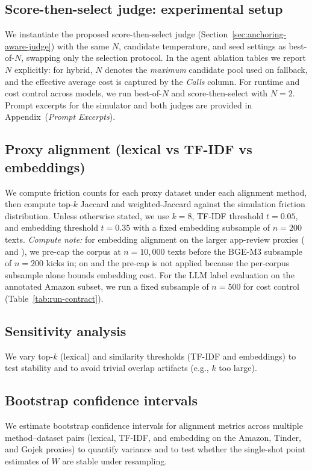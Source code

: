 \subsection{Score-then-select judge: experimental setup}
\label{sec:anchoring-aware-experiment}
We instantiate the proposed score-then-select judge (Section~\ref{sec:anchoring-aware-judge}) with the same $N$, candidate temperature, and seed settings as best-of-$N$, swapping only the selection protocol. In the agent ablation tables we report $N$ explicitly: for hybrid, $N$ denotes the \emph{maximum} candidate pool used on fallback, and the effective average cost is captured by the \emph{Calls} column. For runtime and cost control across models, we run best-of-$N$ and score-then-select with $N=2$. Prompt excerpts for the simulator and both judges are provided in Appendix~(\emph{Prompt Excerpts}).

\subsection{Proxy alignment (lexical vs TF-IDF vs embeddings)}
We compute friction counts for each proxy dataset under each alignment method, then compute
top-$k$ Jaccard and weighted-Jaccard against the simulation friction distribution.
Unless otherwise stated, we use $k=8$, TF-IDF threshold $t=0.05$, and embedding threshold $t=0.35$ with a fixed embedding subsample of $n=200$ texts.
\emph{Compute note:} for embedding alignment on the larger app-review proxies (\DatasetTinder{} and \DatasetGojek{}), we pre-cap the corpus at $n=10{,}000$ texts before the BGE-M3 subsample of $n=200$ kicks in; on \DatasetTwitter{} and \DatasetAmazon{} the pre-cap is not applied because the per-corpus subsample alone bounds embedding cost.
For the LLM label evaluation on the annotated Amazon subset, we run a fixed subsample of $n=500$ for cost control (Table~\ref{tab:run-contract}).

\subsection{Sensitivity analysis}
We vary top-$k$ (lexical) and similarity thresholds (TF-IDF and embeddings) to test stability and to
avoid trivial overlap artifacts (e.g., $k$ too large).

\subsection{Bootstrap confidence intervals}
We estimate bootstrap confidence intervals for alignment metrics across multiple method--dataset pairs (lexical, TF-IDF, and embedding on the Amazon, Tinder, and Gojek proxies) to quantify variance and to test whether the single-shot point estimates of $W$ are stable under resampling.

